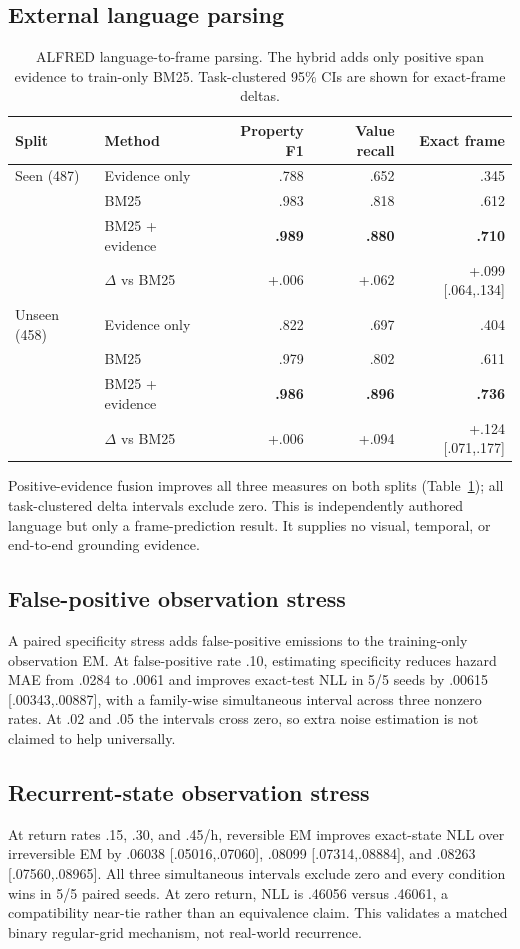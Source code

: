 \documentclass{article}
\begin{document}
\subsection{External language parsing}
\begin{table}[t]
\centering
\caption{ALFRED language-to-frame parsing. The hybrid adds only positive span evidence to train-only BM25. Task-clustered 95\% CIs are shown for exact-frame deltas.}
\label{tab:alfred}
\small
\begin{tabular}{llrrr}
\toprule
Split & Method & Property F1 & Value recall & Exact frame\\
\midrule
Seen (487) & Evidence only & .788 & .652 & .345\\
 & BM25 & .983 & .818 & .612\\
 & BM25 + evidence & \textbf{.989} & \textbf{.880} & \textbf{.710}\\
 & $\Delta$ vs BM25 & +.006 & +.062 & +.099 [.064,.134]\\
\midrule
Unseen (458) & Evidence only & .822 & .697 & .404\\
 & BM25 & .979 & .802 & .611\\
 & BM25 + evidence & \textbf{.986} & \textbf{.896} & \textbf{.736}\\
 & $\Delta$ vs BM25 & +.006 & +.094 & +.124 [.071,.177]\\
\bottomrule
\end{tabular}
\end{table}
Positive-evidence fusion improves all three measures on both splits (Table~\ref{tab:alfred}); all task-clustered delta intervals exclude zero. This is independently authored language but only a frame-prediction result. It supplies no visual, temporal, or end-to-end grounding evidence.

\subsection{False-positive observation stress}

A paired specificity stress adds false-positive emissions to the training-only observation EM. At false-positive rate .10, estimating specificity reduces hazard MAE from .0284 to .0061 and improves exact-test NLL in 5/5 seeds by .00615 [.00343,.00887], with a family-wise simultaneous interval across three nonzero rates. At .02 and .05 the intervals cross zero, so extra noise estimation is not claimed to help universally.
\subsection{Recurrent-state observation stress}
At return rates .15, .30, and .45/h, reversible EM improves exact-state NLL over irreversible EM by .06038 [.05016,.07060], .08099 [.07314,.08884], and .08263 [.07560,.08965]. All three simultaneous intervals exclude zero and every condition wins in 5/5 paired seeds. At zero return, NLL is .46056 versus .46061, a compatibility near-tie rather than an equivalence claim. This validates a matched binary regular-grid mechanism, not real-world recurrence.
\end{document}
